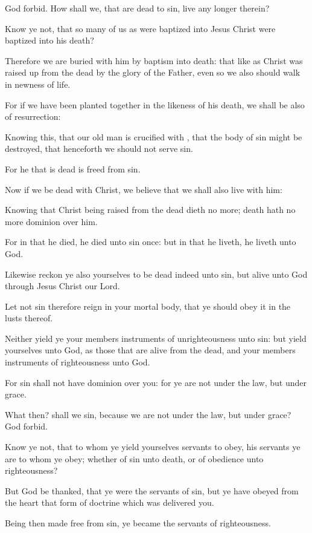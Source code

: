 {God
forbid.
How shall
we,
that are
dead to
sin,
live any
longer
therein?

Know ye
not,
that so many of us
as were
baptized
into
Jesus
Christ were
baptized
into
his
death?

Therefore we are buried
with
him
by
baptism
into
death:
that like
as
Christ was raised
up
from the
dead
by the
glory of the
Father, even
so
we
also should
walk
in
newness of
life.

For
if we have
been planted
together in the
likeness of
his
death, we shall
be
also
{} of
{}
resurrection:

Knowing
this,
that
our
old
man is crucified
with
{},
that the
body of
sin might be
destroyed,
that
henceforth
we
should
not
serve
sin.

For he that is
dead is
freed
from
sin.

Now
if we be
dead
with
Christ, we
believe
that we
shall
also live
with
him:

Knowing
that
Christ being
raised
from the
dead
dieth no
more;
death
hath no
more
dominion over
him.

For in
that he
died, he
died unto
sin
once:
but in
that he
liveth, he
liveth unto
God.

Likewise
reckon
ye
also
yourselves to
be
dead
indeed unto
sin,
but
alive unto
God
through
Jesus
Christ
our
Lord.

Let
not
sin
therefore
reign
in
your
mortal
body, that ye
should
obey
it
in the
lusts
thereof.

Neither yield
ye
your
members
{}
instruments of
unrighteousness unto
sin:
but
yield
yourselves unto
God,
as those that are
alive
from the
dead,
and
your
members
{}
instruments of
righteousness unto
God.

For
sin
shall
not have dominion
over
you:
for ye
are
not
under the
law,
but
under
grace.

What
then? shall we
sin,
because we
are
not
under the
law,
but
under
grace? God
forbid.

Know
ye
not,
that to
whom ye
yield
yourselves
servants
to
obey, his
servants ye
are to
whom ye
obey;
whether of
sin
unto
death,
or of
obedience
unto
righteousness?

But
God be
thanked,
that ye
were the
servants of
sin,
but ye have
obeyed
from the
heart that
form of
doctrine
which was delivered
you.

Being
then made
free
from
sin, ye became the
servants of
righteousness.

}
